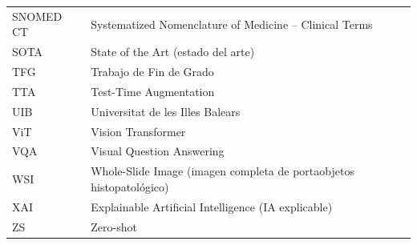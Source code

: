 \begin{tabular}{p{}p{}}
SNOMED CT & Systematized Nomenclature of Medicine -- Clinical Terms \\
SOTA & State of the Art (estado del arte) \\
TFG & Trabajo de Fin de Grado \\
TTA & Test-Time Augmentation \\
UIB & Universitat de les Illes Balears \\
ViT & Vision Transformer \\
VQA & Visual Question Answering \\
WSI & Whole-Slide Image (imagen completa de portaobjetos histopatológico) \\
XAI & Explainable Artificial Intelligence (IA explicable) \\
ZS & Zero-shot \\
\end{tabular}


